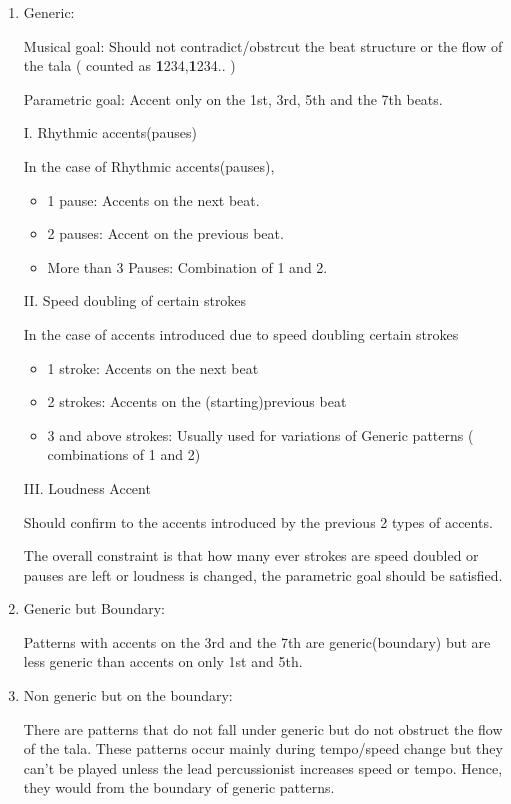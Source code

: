 
\begin{enumerate}


\item Generic:

Musical goal: Should not contradict/obstrcut the beat structure or the flow of the tala ( counted as \textbf{1}234,\textbf{1}234..  )

Parametric goal: Accent only on the 1st, 3rd, 5th and the 7th beats.

I. Rhythmic accents(pauses)

In the case of Rhythmic accents(pauses), 
\begin{itemize}
\item 1 pause:  Accents on the next beat.
\item 2 pauses: Accent on the previous beat.
\item More than 3 Pauses: Combination of 1 and 2.
\end{itemize}

II. Speed doubling of certain strokes

In the case of accents introduced due to speed doubling certain strokes
\begin{itemize}
\item 1 stroke: Accents on the next beat
\item 2 strokes: Accents on the (starting)previous beat
\item 3 and above strokes: Usually used for variations of Generic patterns ( combinations of 1 and 2)
\end{itemize}

III. Loudness Accent

Should confirm to the accents introduced by the previous 2 types of accents.

The overall constraint is that how many ever strokes are speed doubled or pauses are left or loudness is changed, the parametric goal should be satisfied. 

\item Generic but Boundary:

Patterns with accents on the 3rd and the 7th are generic(boundary) but are less generic than accents on only 1st and 5th.

\item Non generic but on the boundary:

There are patterns that do not fall under generic but do not obstruct the flow of the tala. These patterns occur mainly during tempo/speed change but they can't be played unless the lead percussionist increases speed or tempo. Hence, they would from the boundary of generic patterns.


\end{enumerate}
